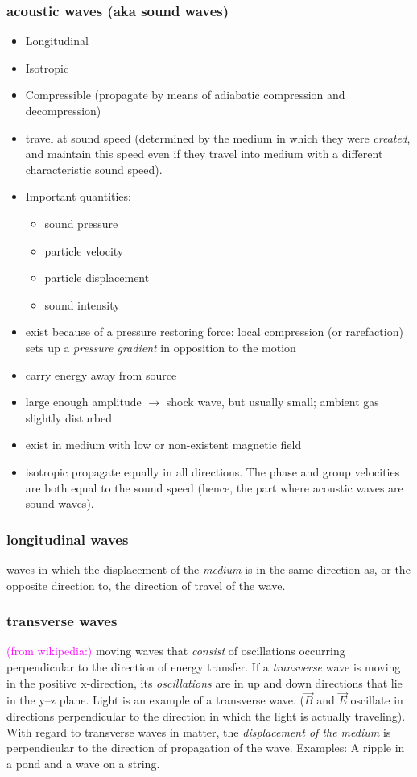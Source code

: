 \documentclass{article}
\begin{document}
\subsubsection{acoustic waves (aka sound waves)}
\begin{itemize}
    \item Longitudinal
    \item Isotropic
    \item Compressible (propagate by means of adiabatic
        compression and decompression)
    \item travel at sound speed (determined by the medium in which
        they were \emph{created}, and maintain this speed even if they
        travel into medium with a different characteristic sound speed).
    \item Important quantities:
        \begin{itemize}
            \item sound pressure
            \item particle velocity
            \item particle displacement
            \item sound intensity
        \end{itemize}
    \item exist because of a pressure restoring force: local compression
        (or rarefaction) sets up a \emph{pressure gradient} in opposition
        to the motion
    \item carry energy away from source
    \item large enough amplitude $\rightarrow$ shock wave,
        but usually small; ambient gas slightly disturbed
    \item exist in medium with low or non-existent magnetic field
    \item isotropic \- propagate equally in all directions. The phase
        and group velocities are both equal to the sound speed (hence, the
        part where acoustic waves are sound waves).
\end{itemize}
\subsubsection{longitudinal waves}
waves in which the displacement of the \emph{medium} is in the
same direction as, or the opposite direction to,
the direction of travel of the wave.
\subsubsection{transverse waves}
\textcolor{magenta}{(from wikipedia:)} moving waves that \emph{consist} of
oscillations occurring perpendicular to the direction of energy transfer. If a
\emph{transverse} wave is moving in the positive x-direction, its
\emph{oscillations} are in up and down directions that lie in the y–z plane.
Light is an example of a transverse wave. ($\vec{B}$ and $\vec{E}$ oscillate in
directions perpendicular to the direction in which the light is actually
traveling). With regard to transverse waves in matter, the \emph{displacement
of the medium} is perpendicular to the direction of propagation of the wave.
Examples: A ripple in a pond and a wave on a string.
\end{document}
